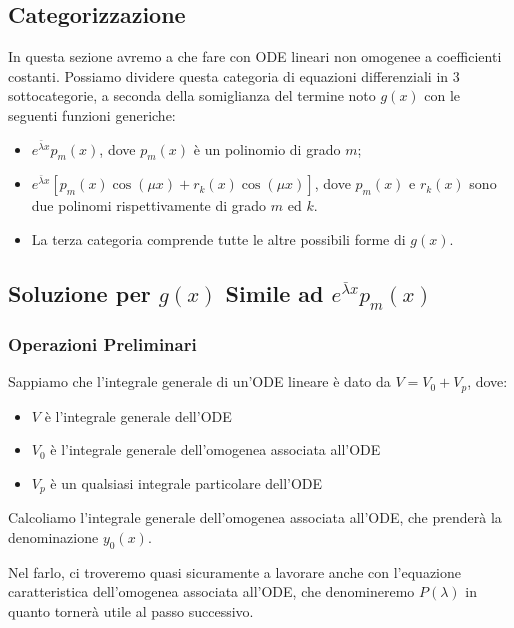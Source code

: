 \documentclass[a4paper,11pt]{article}
\begin{document}
\setcounter{subsection}{0}
\renewcommand*{\theHsubsection}{chX.\the\value{subsection}}
\subsection{Categorizzazione}
In questa sezione avremo a che fare con ODE lineari non omogenee a coefficienti costanti. Possiamo dividere questa categoria di equazioni differenziali in 3 sottocategorie, a seconda della somiglianza del termine noto $g(x)$ con le seguenti funzioni generiche:
\begin{itemize}
    \item $e^{\bar{\lambda} x}p_m(x)$, dove $p_m(x)$ è un polinomio di grado $m$;
    \item $e^{\bar{\lambda} x}[p_m(x)\cos{(\mu x)}+r_k(x)\cos{(\mu x)}]$, dove $p_m(x)$ e $r_k(x)$ sono due polinomi rispettivamente di grado $m$ ed $k$.
    \item La terza categoria comprende tutte le altre possibili forme di $g(x)$.
\end{itemize}

\subsection[\texorpdfstring{$g(x)$ è Prodotto di Esponenziale e Polinomio}{g(x) è Prodotto di Esponenziale e Polinomio}]{Soluzione per $g(x)$ Simile ad $e^{\bar{\lambda} x}p_m(x)$}

\subsubsection{Operazioni Preliminari}
Sappiamo che l'integrale generale di un'ODE lineare è dato da $V=V_0+V_p$, dove:
\begin{itemize}
    \item $V$ è l'integrale generale dell'ODE
    \item $V_0$ è l'integrale generale dell'omogenea associata all'ODE
    \item $V_p$ è un qualsiasi integrale particolare dell'ODE
\end{itemize}

\noindent Calcoliamo l'integrale generale dell'omogenea associata all'ODE, che prenderà la denominazione $y_0(x)$.

\noindent Nel farlo, ci troveremo quasi sicuramente a lavorare anche con l'equazione caratteristica dell'omogenea associata all'ODE, che denomineremo $P(\lambda)$ in quanto tornerà utile al passo successivo.
\end{document}
